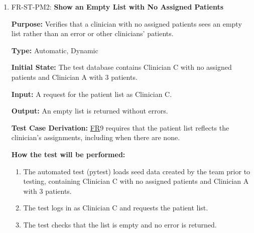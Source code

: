 \documentclass[12pt, titlepage]{article}
\newcommand{\srsfr}[1]{\href{https://github.com/Nour-Fawaz/MacaBoca/blob/main/pdfs/SRS/SRS.pdf}{FR}}
\renewcommand{\_}{\oldunderscore\allowbreak}
\begin{document}
\begin{enumerate}
  \item FR-ST-PM2: \textbf{Show an Empty List with No Assigned Patients\\}
  \begin{mdframed}[linewidth=0.5mm]
      \textbf{Purpose:} Verifies that a clinician with no assigned patients sees an empty list rather than an error or other clinicians' patients. \par
      \textbf{Type:} Automatic, Dynamic \par
      \textbf{Initial State:} The test database contains Clinician C with no assigned patients and Clinician A with 3 patients. \par
      \textbf{Input:} A request for the patient list as Clinician C. \par
      \textbf{Output:} An empty list is returned without errors. \par
      \textbf{Test Case Derivation:} \srsfr*{9} requires that the patient list reflects the clinician's assignments, including when there are none. \par
      \textbf{How the test will be performed:}
      \begin{enumerate}
          \item[1.] The automated test (pytest) loads seed data created by the team prior to testing, containing Clinician C with no assigned patients and Clinician A with 3 patients.
          \item[2.] The test logs in as Clinician C and requests the patient list.
          \item[3.] The test checks that the list is empty and no error is returned.
      \end{enumerate}
  \end{mdframed}


\end{enumerate}
\end{document}
